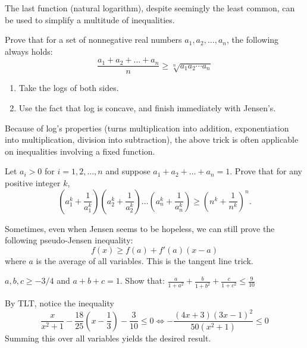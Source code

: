 \documentclass[mast]{lucky}
\begin{document}
The last function (natural logarithm), despite seemingly the least common, can be used to simplify a multitude of inequalities.
\begin{exam}[AM-GM]
Prove that for a set of nonnegative real numbers $a_1,a_2,\ldots,a_n$, the following always holds:\[\frac{a_1+a_2+\ldots+a_n}{n}\geq\sqrt[n]{a_1a_2\cdots a_n}\]
\end{exam}
\begin{walk}
\begin{enumerate}
\item Take the logs of both sides.
\item Use the fact that log is concave, and finish immediately with Jensen's.
\end{enumerate}
\end{walk}
Because of log's properties (turns multiplication into addition, exponentiation into multiplication, division into subtraction), the above trick is often applicable on inequalities involving a fixed function.
\begin{exer}
Let $a_i > 0$ for $i=1,2,\dots,n$ and suppose $a_1 + a_2 + \dots + a_n = 1$. Prove that for any positive integer $k$,
\[ \left( a_1^k + \frac{1}{a_1^k} \right) \left( a_2^k + \frac{1}{a_2^k} \right) \dots \left( a_n^k + \frac{1}{a_n^k} \right) \ge \left( n^k + \frac{1}{n^k} \right)^n. \]
\end{exer}

Sometimes, even when Jensen seems to be hopeless, we can still prove the following pseudo-Jensen inequality:
$$f(x)\ge f(a)+f'(a)(x-a)$$
where $a$ is the average of all variables. This is the tangent line trick.
\begin{exam}[Poland 1996]
$a,b,c \geq-3/4$ and $a+b+c=1$. Show that: $\frac{a}{1+a^{2}}+\frac{b}{1+b^{2}}+\frac{c}{1+c^{2}}\leq \frac{9}{10}$
\end{exam}
\begin{sol}
By TLT, notice the inequality 
$$\frac{x}{x^2+1}-\frac{18}{25}(x-\frac{1}{3})-\frac{3}{10}\le 0 \iff -\frac{(4x+3)(3x-1)^2}{50(x^2+1)}\le 0$$
Summing this over all variables yields the desired result.
\end{sol}
\end{document}
